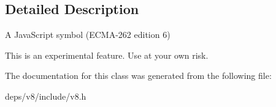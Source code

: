 \subsection{Detailed Description}
A Java\+Script symbol (E\+C\+M\+A-\/262 edition 6)

This is an experimental feature. Use at your own risk. 

The documentation for this class was generated from the following file\+:\begin{DoxyCompactItemize}
\item 
deps/v8/include/v8.\+h\end{DoxyCompactItemize}
